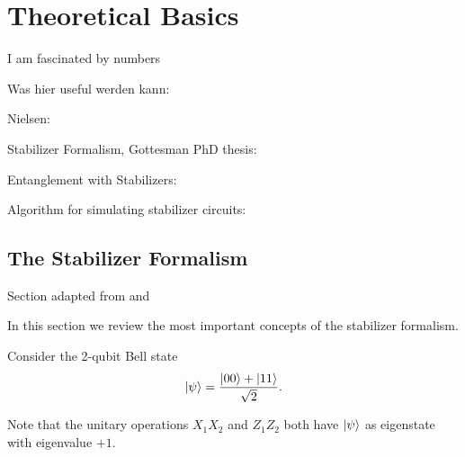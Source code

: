 \chapter{Theoretical Basics}
\label{ch:basics}
\epigraph{I am fascinated by numbers}{
\citeauthor{baron-cohenAutismSpectrumQuotientAQ2001}
\cite{baron-cohenAutismSpectrumQuotientAQ2001}}

Was hier useful werden kann:

Nielsen: \cite{nielsenQuantumComputationQuantum2010}

Stabilizer Formalism, Gottesman PhD thesis: \cite{gottesmanStabilizerCodesQuantum1997}

Entanglement with Stabilizers: \cite{fattalEntanglementStabilizerFormalism2004}

Algorithm for simulating stabilizer circuits:
\cite{aaronsonImprovedSimulationStabilizer2004}

\section{The Stabilizer Formalism}\label{sec:basics-stab}
Section adapted from \cite{nielsenQuantumComputationQuantum2010} and
\cite{gottesmanStabilizerCodesQuantum1997}

In this section we review the most important concepts of the stabilizer
formalism. 

Consider the 2-qubit Bell state
\begin{align}
  \ket{\psi} = \frac{\ket{00} + \ket{11}}{\sqrt{2}} 
.\end{align}

Note that the unitary operations $X_1 X_2$ and $Z_1 Z_2$ both have $\ket{\psi}$
as eigenstate with eigenvalue $+1$.
